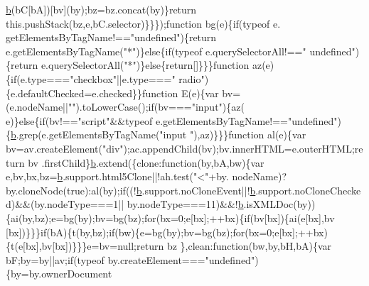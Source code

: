 \begin{DoxyCode}
      \hyperlink{a00039_aa4026ad5544b958e54ce5e106fa1c805}{b}(bC[bA])[bv](by);bz=bz.concat(by)\}\textcolor{keywordflow}{return} this.pushStack(bz,e,bC.selector)\}\}\});\textcolor{keyword}{function} bg(e)\{\textcolor{keywordflow}{if}(typeof e.
      getElementsByTagName!==\textcolor{stringliteral}{"undefined"})\{\textcolor{keywordflow}{return} e.getElementsByTagName(\textcolor{stringliteral}{"*"})\}\textcolor{keywordflow}{else}\{\textcolor{keywordflow}{if}(typeof e.querySelectorAll!==\textcolor{stringliteral}{"
      undefined"})\{\textcolor{keywordflow}{return} e.querySelectorAll(\textcolor{stringliteral}{"*"})\}\textcolor{keywordflow}{else}\{\textcolor{keywordflow}{return}[]\}\}\}\textcolor{keyword}{function} az(e)\{\textcolor{keywordflow}{if}(e.type===\textcolor{stringliteral}{"checkbox"}||e.type===\textcolor{stringliteral}{"
      radio"})\{e.defaultChecked=e.checked\}\}\textcolor{keyword}{function} E(e)\{var bv=(e.nodeName||\textcolor{stringliteral}{""}).toLowerCase();\textcolor{keywordflow}{if}(bv===\textcolor{stringliteral}{"input"})\{az(
      e)\}\textcolor{keywordflow}{else}\{\textcolor{keywordflow}{if}(bv!==\textcolor{stringliteral}{"script"}&&typeof e.getElementsByTagName!==\textcolor{stringliteral}{"undefined"})\{\hyperlink{a00039_aa4026ad5544b958e54ce5e106fa1c805}{b}.grep(e.getElementsByTagName(\textcolor{stringliteral}{"input
      "}),az)\}\}\}\textcolor{keyword}{function} al(e)\{var bv=av.createElement(\textcolor{stringliteral}{"div"});ac.appendChild(bv);bv.innerHTML=e.outerHTML;\textcolor{keywordflow}{return} bv
      .firstChild\}\hyperlink{a00039_aa4026ad5544b958e54ce5e106fa1c805}{b}.extend(\{clone:\textcolor{keyword}{function}(by,bA,bw)\{var e,bv,bx,bz=\hyperlink{a00039_aa4026ad5544b958e54ce5e106fa1c805}{b}.support.html5Clone||!ah.test(\textcolor{stringliteral}{"<"}+by.
      nodeName)?by.cloneNode(\textcolor{keyword}{true}):al(by);\textcolor{keywordflow}{if}((!\hyperlink{a00039_aa4026ad5544b958e54ce5e106fa1c805}{b}.support.noCloneEvent||!\hyperlink{a00039_aa4026ad5544b958e54ce5e106fa1c805}{b}.support.noCloneChecked)&&(by.nodeType===1||
      by.nodeType===11)&&!\hyperlink{a00039_aa4026ad5544b958e54ce5e106fa1c805}{b}.isXMLDoc(by))\{ai(by,bz);e=bg(by);bv=bg(bz);\textcolor{keywordflow}{for}(bx=0;e[bx];++bx)\{\textcolor{keywordflow}{if}(bv[bx])\{ai(e[bx],bv
      [bx])\}\}\}\textcolor{keywordflow}{if}(bA)\{t(by,bz);\textcolor{keywordflow}{if}(bw)\{e=bg(by);bv=bg(bz);\textcolor{keywordflow}{for}(bx=0;e[bx];++bx)\{t(e[bx],bv[bx])\}\}\}e=bv=null;\textcolor{keywordflow}{return} bz
      \},clean:\textcolor{keyword}{function}(bw,by,bH,bA)\{var bF;by=by||av;\textcolor{keywordflow}{if}(typeof by.createElement===\textcolor{stringliteral}{"undefined"})\{by=by.ownerDocument

\end{DoxyCode}
